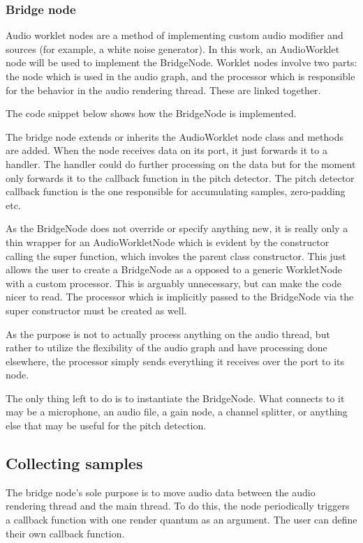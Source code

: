 \subsubsection{Bridge node}
Audio worklet nodes are a method of implementing custom audio modifier and sources (for example, a white noise generator). In this work, an AudioWorklet node will be used to implement the BridgeNode. Worklet nodes involve two parts: the node which is used in the audio graph, and the processor which is responsible for the behavior in the audio rendering thread. These are linked together.

The code snippet below shows how the BridgeNode is implemented.

The bridge node extends or inherits the AudioWorklet node class and methods are added. When the node receives data on its port, it just forwards it to a handler. The handler could do further processing on the data but for the moment only forwards it to the callback function in the pitch detector. The pitch detector callback function is the one responsible for accumulating samples, zero-padding etc.

As the BridgeNode does not override or specify anything new, it is really only a thin wrapper for an AudioWorkletNode which is evident by the constructor calling the super function, which invokes the parent class constructor. This just allows the user to create a BridgeNode as a opposed to a generic WorkletNode with a custom processor. This is arguably unnecessary, but can make the code nicer to read. The processor which is implicitly passed to the BridgeNode via the super constructor must be created as well.



As the purpose is not to actually process anything on the audio thread, but rather to utilize the flexibility of the audio graph and have processing done elsewhere, the processor simply sends everything it receives over the port to its node. 

The only thing left to do is to instantiate the BridgeNode. What connects to it may be a microphone, an audio file, a gain node, a channel splitter, or anything else that may be useful for the pitch detection.


\subsection{Collecting samples}
The bridge node's sole purpose is to move audio data between the audio rendering thread and the main thread. To do this, the node periodically triggers a callback function with one render quantum as an argument. The user can define their own callback function.

